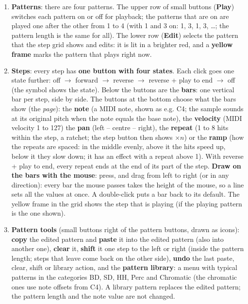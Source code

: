 \documentclass[12pt]{article}
\begin{document}
\begin{enumerate}
    \item \textbf{Patterns}: there are four patterns. The upper row of small buttons (\textbf{Play}) switches each pattern on or off for
    playback; the patterns that are on are played one after the other from 1 to 4 (with 1 and 3 on: 1, 3, 1, 3, \dots; the pattern length is
    the same for all). The lower row (\textbf{Edit}) selects the pattern that the step grid shows and edits: it is lit in a brighter red, and a
    \textbf{yellow frame} marks the pattern that plays right now.
    \item \textbf{Steps}: every step has \textbf{one button with four states}. Each click goes one state further: off $\rightarrow$ forward $\rightarrow$
    reverse $\rightarrow$ reverse + play to end $\rightarrow$ off (the symbol shows the state). Below the buttons are the \textbf{bars}: one vertical bar per step,
    side by side. The buttons at the bottom choose what the bars show (the \emph{page}): the \textbf{note} (a MIDI note, shown as e.g. C4; the sample sounds at its
    original pitch when the note equals the base note), the \textbf{velocity} (MIDI velocity 1 to 127) the \textbf{pan} (left -- centre -- right), the \textbf{repeat} (1 to 8 hits within the step, a ratchet; the step button then shows $\times n$) or the
    \textbf{ramp} (how the repeats are spaced: in the middle evenly, above it the hits speed up, below it they slow down; it has an effect with a repeat above 1).
    With reverse + play to end, every repeat ends at the end of its part of the step.
    \textbf{Draw on the bars with the mouse}: press, and drag from left to right (or in any direction): every bar the mouse passes takes the height of the mouse, so a
    line sets all the values at once. A double-click puts a bar back to its default. The yellow frame in the grid shows the step that is playing
    (if the playing pattern is the one shown).
    \item \textbf{Pattern tools} (small buttons right of the pattern buttons, drawn as icons): \textbf{copy} the edited pattern and \textbf{paste} it into the edited
    pattern (also into another one), \textbf{clear} it, \textbf{shift} it one step to the left or right (inside the pattern length; steps that leave come back on the other side),
    \textbf{undo} the last paste, clear, shift or library action, and the \textbf{pattern library}: a menu with typical patterns in the categories BD, SD, HH, Perc and
    Chromatic (the chromatic ones use note offsets from C4). A library pattern replaces the edited pattern; the pattern length and the note value are not changed.

\end{enumerate}
\end{document}
